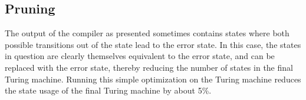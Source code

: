 \documentclass{report}
\begin{document}
\subsection{Pruning}

The output of the compiler as presented sometimes contains states where both possible transitions out of the state lead to the error state. In this case, the states in question are clearly themselves equivalent to the error state, and can be replaced with the error state, thereby reducing the number of states in the final Turing machine. Running this simple optimization on the Turing machine reduces the state usage of the final Turing machine by about 5\%.


\end{document}
